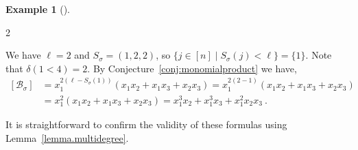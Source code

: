 \documentclass[11pt]{amsart}
\theoremstyle{remark}
\theoremstyle{remark}
\theoremstyle{definition}
\theoremstyle{definition}
\theoremstyle{definition}
\newtheorem{eg_no_qed}[theorem]{Example}
\newenvironment{ex}[1][]{\begin{eg_no_qed}[#1]\renewcommand{\qedsymbol}{$\Diamond$}\pushQED{\qed}}{\popQED\end{eg_no_qed}}
\numberwithin{equation}{section}
\newcommand{\gd}{\delta}
\newcommand{\gs}{\sigma}
\newcommand{\cb}{\mathcal{B}}
\begin{document}
\begin{ex}
\begin{multicols}{2}
\end{multicols}
\noindent We have $\ell=2$ and  $S_\gs=(1,2,2)$, so $\{j\in[n]\mid S_\gs(j)<\ell\}=\{1\}$. Note that $\gd(1<4)=2$. By Conjecture~\ref{conj:monomialproduct} we have,
\begin{equation*}
\begin{split}
[\cb_\gs]&=x_1^{2(\ell-S_\gs(1))} \left(x_1x_2+x_1x_3+x_2x_3\right)=x_1^{2(2-1)}\left(x_1x_2+x_1x_3+x_2x_3\right)\\
&=x_1^2\left(x_1x_2+x_1x_3+x_2x_3\right)=x_1^3x_2+x_1^3x_3+x_1^2x_2x_3 \ . 
\end{split}
\end{equation*}    

It is straightforward to confirm the validity of these formulas using Lemma~\ref{lemma.multidegree}.
\end{ex}
\end{document}

